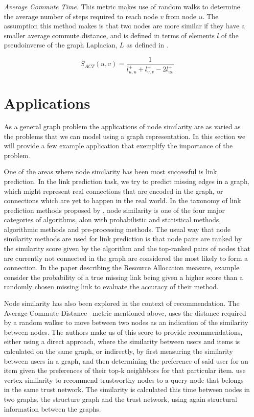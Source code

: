 \emph{Average Commute Time.} This metric makes use of random walks to determine
the average number of steps required to reach node $v$ from node $u$. The assumption
this method makes is that two nodes are more similar if they have a smaller average
commute distance, and is defined in terms of elements $l$ of the pseudoinverse of the
graph Laplacian, $L$ as defined in \cite{link-prediction-survey}.

\begin{equation}
	S_{ACT}(u, v)=\frac{1}{l_{u, u}^{+}+l_{v, v}^{+}-2 l_{uv}^{+}}
\end{equation}


\section{Applications}

As a general graph problem the applications of node similarity are as varied
as the problems that we can model using a graph representation. In this
section we will provide a few example application that exemplify the importance
of the problem.

One of the areas where node similarity has been most successful is link
prediction. In the link prediction task, we try to predict missing
edges in a graph, which might represent real connections that are encoded
in the graph, or connections which are yet to happen in the real world.
In the taxonomy of link prediction methods proposed by
\citet{link-prediction-survey-2017}, node similarity is one of the
four major categories of algorithms, alon with probabilistic and
statistical methods, algorithmic methods and pre-processing methods.
The usual way that node similarity methods are used for link prediction
is that node pairs are ranked by the similarity score given by the
algorithm and the top-ranked pairs of nodes that are currently not connected
in the graph are considered the most likely to form a connection.
In the paper describing the Resource Allocation measure, \citet{resource-allocation-sim}
example consider the probability of a true missing link
being given a higher score than a randomly chosen missing link
to evaluate the accuracy of their method.


Node similarity has also been explored in the context of recommendation.
The Average Commute Distance~\cite{average-commute-distance} metric mentioned above, uses the distance
required by a random walker to move between two nodes as an indication
of the similarity between nodes. The authors make us of this score
to provide recommendations, either using a direct approach, where
the similarity between users and items is calculated on the same
graph, or indirectly, by first measuring the similarity between
users in a graph, and then determining the preference of said
user for an item given the preferences of their top-k neighbbors
for that particular item.
\citet{trust-similarity} use vertex similarity to recommend trustworthy
nodes to a query node that belongs in the same trust network.
The similarity is calculated this time between
nodes in two graphs, the structure graph and the trust network,
using again structural information between the graphs.

